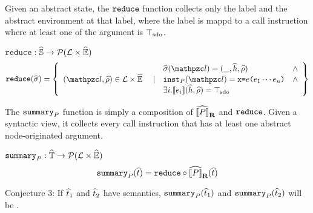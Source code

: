 Given an abstract state, the $\code{reduce}$ function
collects only the label and the abstract environment at that label,
where the label is mappd to a call instruction where at least one of the argument is $\top_\text{sdo}$.

$\code{reduce} : \astset \rightarrow \powerset{\labset \times \aenvset} $
\[
  \code{reduce}(\astate) = \left\{
    \begin{array}{cclc}
    &&\astate(\lab) = (\_, \aheap, \aenv) &\wedge\\
    (\lab, \aenv) \in \labset \times \aenvset \ &\mid& \getinst{\prog}(\lab) = \varx \kweq \expr \kwrl \expr_1 \cdots \expr_n \kwrr &\wedge\\
    && \exists i.\sem{\expr_i}(\aheap, \aenv) = \sdotop\\
    \end{array}
    \right\}
\]

The $\code{summary}_\prog$ function is simply a composition of $\widehat{\llbracket{P}\rrbracket}_\textbf{R}$ and $\code{reduce}$.
Given a syntactic view, it collects every call instruction that has at least
one abstract node-originated argument.

$\code{summary}_\prog : \atreeset \rightarrow \powerset{\labset \times \aenvset}$
\[
  \code{summary}_\prog(\atree) = \code{reduce} \circ \rasem{\prog} (\atree)
\]

Conjecture 3: If $\widehat{t}_1$ and $\widehat{t}_2$ have  semantics,
$\code{summary}_\prog(\atree_1)$ and $\code{summary}_\prog(\atree_2)$ will be .

